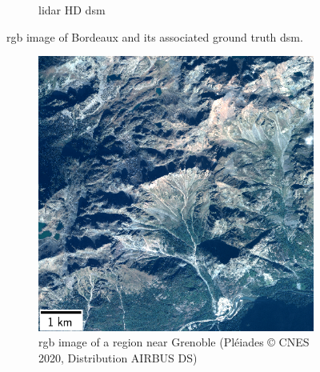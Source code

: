 \begin{figure}
\begin{subfigure}[t]{0.48\linewidth}
        \caption{\acrshort{lidar} HD \acrshort{dsm}}
        \label{fig:miniature_Bordeaux_gt}
    \end{subfigure}
    \caption{\acrshort{rgb} image of Bordeaux and its associated ground truth \acrshort{dsm}.}
    \label{fig:miniature_Bordeaux}
\end{figure}

\begin{figure}
    \centering
    \begin{subfigure}[t]{0.48\linewidth}
        \flushleft
        \includegraphics[width=\linewidth]{Images/Chap_6/miniature_Grenoble.png}
        \caption{\acrshort{rgb} image of a region near Grenoble (Pléiades © CNES 2020, Distribution AIRBUS DS)}
        \label{fig:miniature_Grenoble_rgb}
    \end{subfigure}\hfill
    \begin{subfigure}[t]{0.48\linewidth}
        \flushright

\end{subfigure}
\end{figure}
